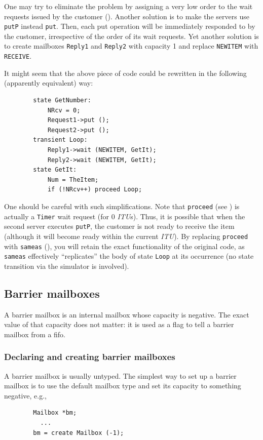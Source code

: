 One may try to eliminate the problem by assigning a very low order to
the wait requests issued by the customer ().
Another solution
is to make the servers use {\tt putP} instead {\tt put}.
Then, each put operation will be immediately responded to by the customer,
irrespective of the order of its wait requests.
Yet another solution is to create mailboxes {\tt Reply1} and {\tt Reply2}
with capacity 1 and replace {\tt NEWITEM} with {\tt RECEIVE}.

It might seem that the above piece of code could be rewritten in
the following (apparently equivalent) way:
\begin{verbatim}
        state GetNumber:
            NRcv = 0;
            Request1->put ();
            Request2->put ();
        transient Loop:
            Reply1->wait (NEWITEM, GetIt);
            Reply2->wait (NEWITEM, GetIt);
        state GetIt:
            Num = TheItem;
            if (!NRcv++) proceed Loop;
\end{verbatim}
One should be careful with such simplifications.
Note that {\tt proceed} (see ) is
actually a {\tt Timer} wait request (for 0 {\em ITU\/}s).
Thus, it is possible that when the second server executes {\tt putP},
the customer is not ready to receive the item (although it will become
ready within the current {\em ITU\/}).
By replacing {\tt proceed} with {\tt sameas} (), you will
retain the exact functionality of the original code, as
{\tt sameas} effectively ``replicates'' the body of state {\tt Loop} at
its occurrence (no state transition via the simulator is involved).

\subsection{Barrier mailboxes}
\label{rm_mb_ba}

A barrier mailbox is an internal mailbox whose capacity is negative.
The exact value of that capacity does not matter: it is used as a flag to tell
a barrier mailbox from a fifo.

\subsubsection{Declaring and creating barrier mailboxes}
\label{rm_mb_ba_dc}

A barrier mailbox is usually untyped.
The simplest way to set up a barrier mailbox is to use the default mailbox
type and set its capacity to something negative, e.g.,
\begin{verbatim}
        Mailbox *bm;
          ...
        bm = create Mailbox (-1);
\end{verbatim}

